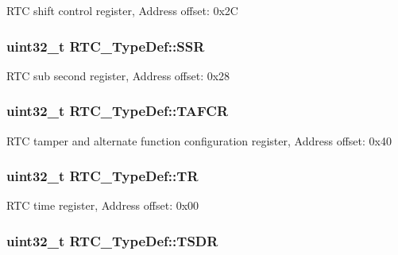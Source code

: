 R\-T\-C shift control register, Address offset\-: 0x2\-C \hypertarget{struct_r_t_c___type_def_aefbd38be87117d1fced289bf9c534414}{
\subsubsection[{S\-S\-R}]{ uint32\-\_\-t R\-T\-C\-\_\-\-Type\-Def\-::\-S\-S\-R}}\label{struct_r_t_c___type_def_aefbd38be87117d1fced289bf9c534414}
R\-T\-C sub second register, Address offset\-: 0x28 \hypertarget{struct_r_t_c___type_def_a498ecce9715c916dd09134fddd0072c0}{
\subsubsection[{T\-A\-F\-C\-R}]{ uint32\-\_\-t R\-T\-C\-\_\-\-Type\-Def\-::\-T\-A\-F\-C\-R}}\label{struct_r_t_c___type_def_a498ecce9715c916dd09134fddd0072c0}
R\-T\-C tamper and alternate function configuration register, Address offset\-: 0x40 \hypertarget{struct_r_t_c___type_def_a2e8783857f8644a4eb80ebc51e1cba42}{
\subsubsection[{T\-R}]{ uint32\-\_\-t R\-T\-C\-\_\-\-Type\-Def\-::\-T\-R}}\label{struct_r_t_c___type_def_a2e8783857f8644a4eb80ebc51e1cba42}
R\-T\-C time register, Address offset\-: 0x00 \hypertarget{struct_r_t_c___type_def_aa4633dbcdb5dd41a714020903fd67c82}{
\subsubsection[{T\-S\-D\-R}]{ uint32\-\_\-t R\-T\-C\-\_\-\-Type\-Def\-::\-T\-S\-D\-R}}\label{struct_r_t_c___type_def_aa4633dbcdb5dd41a714020903fd67c82}
